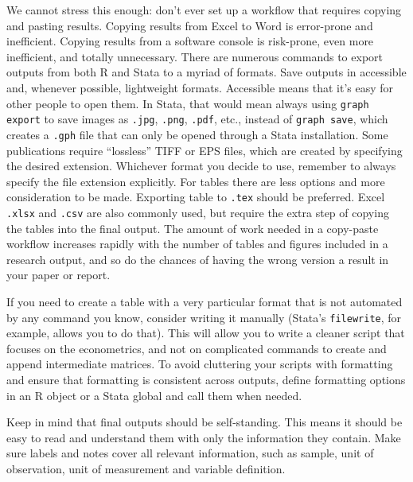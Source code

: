 We cannot stress this enough:
don't ever set up a workflow that requires copying and pasting results.
Copying results from Excel to Word is error-prone and inefficient.
Copying results from a software console is risk-prone,
even more inefficient, and totally unnecessary.
There are numerous commands to export outputs from both R and Stata to a myriad of formats.
Save outputs in accessible and, whenever possible, lightweight formats.
Accessible means that it's easy for other people to open them.
In Stata, that would mean always using \texttt{graph export} to save images as
\texttt{.jpg}, \texttt{.png}, \texttt{.pdf}, etc.,
instead of \texttt{graph save},
which creates a \texttt{.gph} file that can only be opened through a Stata installation.
Some publications require ``lossless'' TIFF or EPS files, which are created by specifying the desired extension.
Whichever format you decide to use, remember to always specify the file extension explicitly.
For tables there are less options and more consideration to be made.
Exporting table to \texttt{.tex} should be preferred.
Excel \texttt{.xlsx} and \texttt{.csv} are also commonly used,
but require the extra step of copying the tables into the final output.
The amount of work needed in a copy-paste workflow increases
rapidly with the number of tables and figures included in a research output,
and so do the chances of having the wrong version a result in your paper or report.

If you need to create a table with a very particular format
that is not automated by any command you know, consider writing it manually
(Stata's \texttt{filewrite}, for example, allows you to do that).
This will allow you to write a cleaner script that focuses on the econometrics,
and not on complicated commands to create and append intermediate matrices.
To avoid cluttering your scripts with formatting and ensure that formatting is consistent across outputs,
define formatting options in an R object or a Stata global and call them when needed.

Keep in mind that final outputs should be self-standing.
This means it should be easy to read and understand them with only the information they contain.
Make sure labels and notes cover all relevant information, such as sample,
unit of observation, unit of measurement and variable definition.


